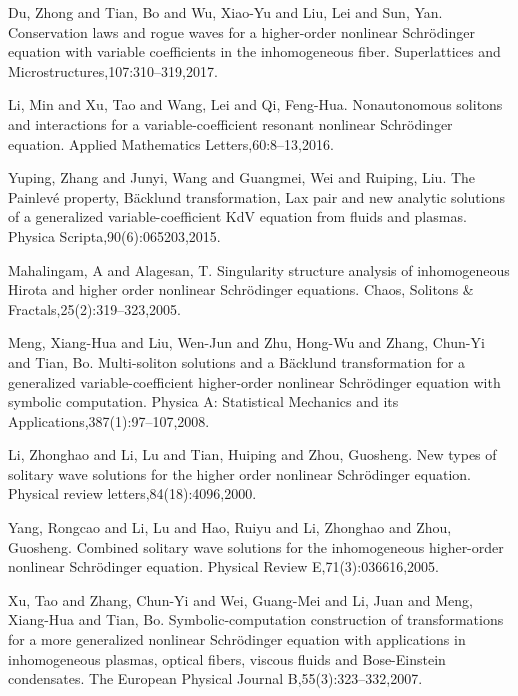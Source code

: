 \documentclass[12pt]{article}
\begin{document}
\begin{thebibliography}{19}
Du, Zhong and Tian, Bo and Wu, Xiao-Yu and Liu, Lei and Sun, Yan. Conservation laws and rogue waves for a higher-order nonlinear Schr{\"o}dinger equation with variable coefficients in the inhomogeneous fiber. Superlattices and Microstructures,107:310--319,2017.

Li, Min and Xu, Tao and Wang, Lei and Qi, Feng-Hua. Nonautonomous solitons and interactions for a variable-coefficient resonant nonlinear Schr{\"o}dinger equation. Applied Mathematics Letters,60:8--13,2016.

Yuping, Zhang and Junyi, Wang and Guangmei, Wei and Ruiping, Liu. The Painlev{\'e} property, B{\"a}cklund transformation, Lax pair and new analytic solutions of a generalized variable-coefficient KdV equation from fluids and plasmas. Physica Scripta,90(6):065203,2015.

Mahalingam, A and Alagesan, T. Singularity structure analysis of inhomogeneous Hirota and higher order nonlinear Schr{\"o}dinger equations. Chaos, Solitons \& Fractals,25(2):319--323,2005.

Meng, Xiang-Hua and Liu, Wen-Jun and Zhu, Hong-Wu and Zhang, Chun-Yi and Tian, Bo. Multi-soliton solutions and a B{\"a}cklund transformation for a generalized variable-coefficient higher-order nonlinear Schr{\"o}dinger equation with symbolic computation. Physica A: Statistical Mechanics and its Applications,387(1):97--107,2008.

Li, Zhonghao and Li, Lu and Tian, Huiping and Zhou, Guosheng. New types of solitary wave solutions for the higher order nonlinear Schr{\"o}dinger equation. Physical review letters,84(18):4096,2000.

Yang, Rongcao and Li, Lu and Hao, Ruiyu and Li, Zhonghao and Zhou, Guosheng. Combined solitary wave solutions for the inhomogeneous higher-order nonlinear Schr{\"o}dinger equation. Physical Review E,71(3):036616,2005.

Xu, Tao and Zhang, Chun-Yi and Wei, Guang-Mei and Li, Juan and Meng, Xiang-Hua and Tian, Bo. Symbolic-computation construction of transformations for a more generalized nonlinear Schr{\"o}dinger equation with applications in inhomogeneous plasmas, optical fibers, viscous fluids and Bose-Einstein condensates. The European Physical Journal B,55(3):323--332,2007.

\end{thebibliography}
\end{document}

